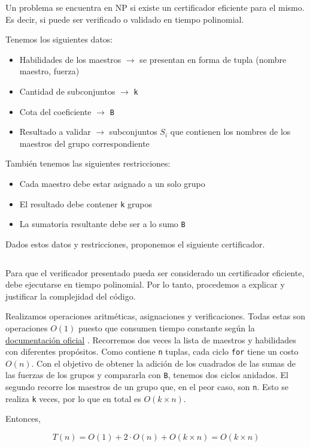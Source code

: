 \documentclass{article}
\newcommand{\docuPy}{%
  {\href{https://wiki.python.org/moin/TimeComplexity}{documentación oficial}}
  }%
\begin{document}
Un problema se encuentra en NP si existe un certificador eficiente para el mismo. Es decir, si puede ser verificado o validado en tiempo polinomial. 

Tenemos los siguientes datos:
\begin{itemize}
    \item Habilidades de los maestros $\rightarrow$ se presentan en forma de tupla (nombre maestro, fuerza)
    \item Cantidad de subconjuntos $\rightarrow$ \texttt{k}
    \item Cota del coeficiente $\rightarrow$ \texttt{B}
    \item Resultado a validar $\rightarrow$ subconjuntos $S_i$ que contienen los nombres de los maestros del grupo correspondiente
\end{itemize}

También tenemos las siguientes restricciones:
\begin{itemize}
    \item Cada maestro debe estar asignado a un solo grupo
    \item El resultado debe contener \texttt{k} grupos
    \item La sumatoria resultante debe ser a lo sumo \texttt{B} 
\end{itemize}

Dados estos datos y restricciones, proponemos el siguiente certificador.
\inputminted[linenos, firstline=1, lastline=31]{python}{codigo/certificador_eficiente.py}

Para que el verificador presentado pueda ser considerado un certificador eficiente, debe ejecutarse en tiempo polinomial. Por lo tanto, procedemos a explicar y justificar la complejidad del código.

Realizamos operaciones aritméticas, asignaciones y verificaciones. Todas estas son operaciones $O(1)$ puesto que consumen tiempo constante según la \docuPy. Recorremos dos veces la lista de maestros y habilidades con diferentes propósitos. Como contiene \texttt{n} tuplas, cada ciclo \texttt{for} tiene un costo $O(n)$. Con el objetivo de obtener la adición de los cuadrados de las sumas de las fuerzas de los grupos y compararla con \texttt{B}, tenemos dos ciclos anidados. El segundo recorre los maestros de un grupo que, en el peor caso, son \texttt{n}. Esto se realiza \texttt{k} veces, por lo que en total es $O(k \times n)$.

Entonces,

$$
T(n) = O(1) + 2 \cdot O(n) + O(k \times n) = O(k \times n)  
$$
\end{document}
